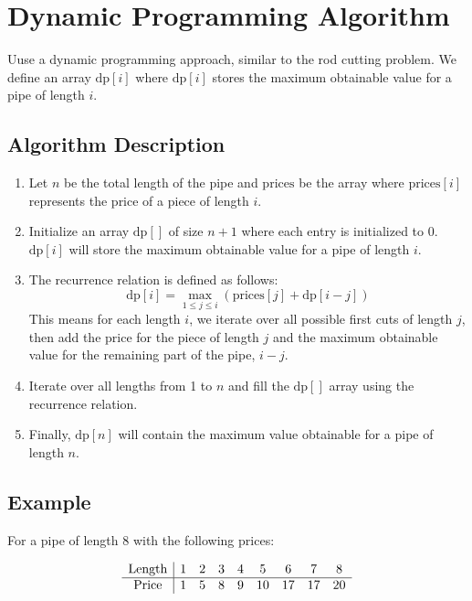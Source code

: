 \documentclass[11pt]{article}
\begin{document}
\section*{Dynamic Programming Algorithm}

Uuse a dynamic programming approach, similar to the rod cutting problem. We define an array \( \text{dp}[i] \) where \( \text{dp}[i] \) stores the maximum obtainable value for a pipe of length \( i \).

\subsection*{Algorithm Description}

\begin{enumerate}
    \item Let \( n \) be the total length of the pipe and \( \text{prices} \) be the array where \( \text{prices}[i] \) represents the price of a piece of length \( i \).
    \item Initialize an array \( \text{dp}[] \) of size \( n+1 \) where each entry is initialized to 0. \( \text{dp}[i] \) will store the maximum obtainable value for a pipe of length \( i \).
    \item The recurrence relation is defined as follows:
    \[
    \text{dp}[i] = \max_{1 \leq j \leq i} (\text{prices}[j] + \text{dp}[i-j])
    \]
    This means for each length \( i \), we iterate over all possible first cuts of length \( j \), then add the price for the piece of length \( j \) and the maximum obtainable value for the remaining part of the pipe, \( i - j \).
    \item Iterate over all lengths from 1 to \( n \) and fill the \( \text{dp}[] \) array using the recurrence relation.
    \item Finally, \( \text{dp}[n] \) will contain the maximum value obtainable for a pipe of length \( n \).
\end{enumerate}

\subsection*{Example}

For a pipe of length 8 with the following prices:

\[
\begin{array}{c|c c c c c c c c}
\text{Length} & 1 & 2 & 3 & 4 & 5 & 6 & 7 & 8 \\
\hline
\text{Price}  & 1 & 5 & 8 & 9 & 10 & 17 & 17 & 20 \\
\end{array}
\]
\end{document}
